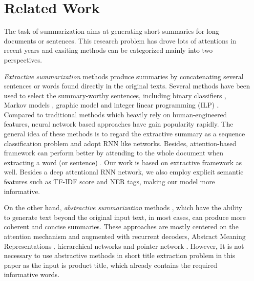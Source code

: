 \section{Related Work}

The task of summarization aims at generating short summaries for 
long documents or sentences. 
This research problem has drove lots of attentions in recent years and exsiting methods can be categorized mainly into two perspectives. 

\textit{Extractive summarization} methods \cite{erkan2004lexpagerank,mcdonald2007study,wong2008extractive} produce summaries by concatenating several sentences or words found directly in the original texts. 
Several methods have been used to select the summary-worthy sentences, 
including binary classifiers \cite{kupiec1995trainable}, Markov models \cite{conroy2001text}, graphic model \cite{erkan2004lexpagerank,mihalcea2005language} and integer linear programming (ILP) \cite{woodsend2010automatic}. 
Compared to traditional methods which heavily rely on human-engineered 
features, neural network based approaches \cite{kaageback2014extractive,cheng2016neural,nallapati2017summarunner,narayan2017neural} have gain 
popularity rapidly. The general idea of these methods is to regard the 
extractive summary as a sequence classification problem
and adopt RNN like networks. 
Besides, attention-based framework can perform better by attending to the whole document when extracting a word (or sentence) \cite{cheng2016neural}.
Our work is based on extractive framework as well. Besides a deep attentional RNN network, 
we also employ explicit semantic features such as TF-IDF score and NER tags, 
making our model more informative.

On the other hand, \textit{abstractive summarization} methods \cite{chen2016distraction,nallapati2016abstractive,see2017get}, 
which have the ability to generate text beyond the original input text, 
in most cases, can produce more coherent and concise summaries. 
These approaches are mostly centered on the attention mechanism and 
augmented with recurrent decoders\cite{chopra2016abstractive}, 
Abstract Meaning Representations \cite{takase2016neural}, 
hierarchical networks \cite{nallapati2016abstractive} 
and pointer network \cite{see2017get}. 
However, It is not necessary to use abstractive methods in 
short title extraction problem in this paper as the input is product title, 
which already contains the required informative words. 

